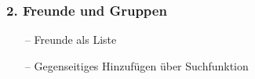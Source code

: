 \documentclass[aspectratio=1610]{beamer}
\begin{document}
	\begin{frame}[plain]
	\frametitle{2. Freunde und Gruppen}
	\begin{minipage}{0.5\textwidth}
		\setlength{\fboxsep}{0pt}%
		\setlength{\fboxrule}{1pt}%
		\captionsetup{labelformat=empty}
		\centering
	\end{minipage}%
	\begin{minipage}{0.5\textwidth}
		\begin{itemize}
			\setlength\itemsep{0.3em}
			\item[--] Freunde als Liste
			\item[--]	Gegenseitiges Hinzufügen über Suchfunktion
		\end{itemize}
	\end{minipage}%
	\end{frame}
\end{document}
